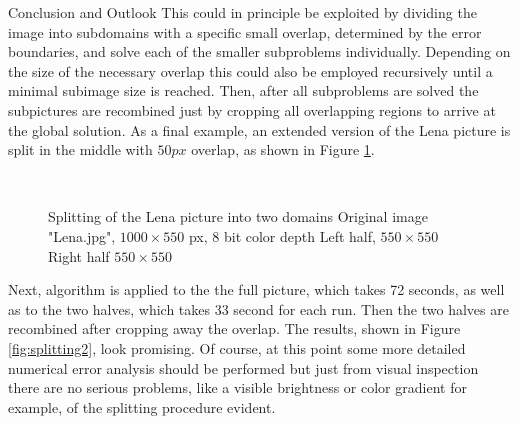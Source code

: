 \begin{chapter}{Conclusion and Outlook}
This could in principle be exploited by dividing the image into subdomains with a specific small overlap, determined by the error boundaries, and solve each of the smaller 
subproblems individually. Depending on the size of the necessary overlap this could also be employed recursively until a minimal subimage size is reached. Then, after all subproblems
are solved the subpictures are recombined just by cropping all overlapping regions to arrive at the global solution.
As a final example, an extended version of the Lena picture is split in the middle with $50px$ overlap, as shown in Figure \ref{fig:splitting1}.

\begin{figure}[h!]
    \centering
    \\
    \caption[Splitting the image domain]{Splitting of the Lena picture into two domains
	 Original image "Lena.jpg", $1000\times 550$ px, 8 bit color depth
	 Left half, $550\times 550$
	 Right half $550\times 550$
	\label{fig:splitting1}
    }
\end{figure}
Next, algorithm is applied to the the full picture, which takes 72 seconds, as well as to the two halves, which takes 
33 second for each run. Then the two halves are recombined after cropping away the overlap. The results, shown in
Figure \ref{fig:splitting2}, look promising. Of course, at this point some more detailed numerical error analysis
should be performed but just from visual inspection there are no serious problems, like a visible brightness or color gradient for example, of the splitting procedure evident.\\


\end{chapter}
